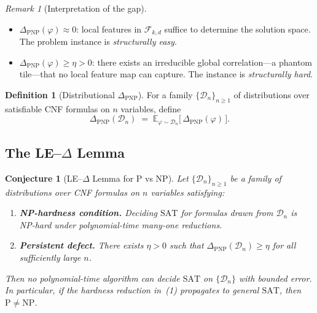 \documentclass[11pt]{article}
\newtheorem{conjecture}[theorem]{Conjecture}
\theoremstyle{definition}
\newtheorem{definition}[theorem]{Definition}
\theoremstyle{remark}
\newtheorem{remark}[theorem]{Remark}
\newcommand{\SAT}{\mathrm{SAT}}
\begin{document}
\begin{remark}[Interpretation of the gap]
\label{rem:gap-interpretation}
\mbox{}
\begin{itemize}[nosep]
\item $\Delta_{\mathrm{PNP}}(\varphi) \approx 0$: local features in
  $\mathcal{F}_{k,d}$ suffice to determine the solution space.
  The problem instance is \emph{structurally easy}.
\item $\Delta_{\mathrm{PNP}}(\varphi) \geq \eta > 0$: there exists an
  irreducible global correlation---a phantom tile---that no local
  feature map can capture.  The instance is \emph{structurally hard}.
\end{itemize}
\end{remark}

\begin{definition}[Distributional $\Delta_{\mathrm{PNP}}$]
\label{def:delta-pnp-dist}
For a family $\{\mathcal{D}_n\}_{n \geq 1}$ of distributions over
satisfiable CNF formulas on $n$ variables, define
\[
  \Delta_{\mathrm{PNP}}(\mathcal{D}_n)
  \;=\;
  \mathbb{E}_{\varphi \sim \mathcal{D}_n}\!\bigl[\,
    \Delta_{\mathrm{PNP}}(\varphi)
  \,\bigr].
\]
\end{definition}

\subsection{The LE--$\Delta$ Lemma}

\begin{conjecture}[LE--$\Delta$ Lemma for P vs NP]
\label{conj:le-delta}
Let $\{\mathcal{D}_n\}_{n \geq 1}$ be a family of distributions over
CNF formulas on $n$ variables satisfying:
\begin{enumerate}[label=\textup{(\arabic*)},nosep]
\item \textbf{NP-hardness condition.}\;
  Deciding $\SAT$ for formulas drawn from $\mathcal{D}_n$ is
  NP-hard under polynomial-time many-one reductions.
\item \textbf{Persistent defect.}\;
  There exists $\eta > 0$ such that
  $\Delta_{\mathrm{PNP}}(\mathcal{D}_n) \geq \eta$ for all
  sufficiently large $n$.
\end{enumerate}
Then no polynomial-time algorithm can decide $\SAT$ on
$\{\mathcal{D}_n\}$ with bounded error.  In particular, if the
hardness reduction in~\textup{(1)} propagates to general $\SAT$,
then $\mathrm{P} \neq \mathrm{NP}$.
\end{conjecture}
\end{document}
